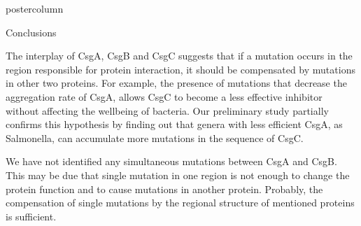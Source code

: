 \documentclass[final]{beamer}\usepackage[]{graphicx}\usepackage[]{color}
\begin{document}
\begin{frame}
\begin{columns}
\begin{column}{.51\textwidth}
\begin{beamercolorbox}[center,wd=\textwidth]{postercolumn}
\begin{minipage}[T]{.95\textwidth}
{    \begin{block}{Conclusions}
      
      
      The interplay of CsgA, CsgB and CsgC suggests that if a mutation occurs in the region responsible for protein interaction, it should be compensated by mutations in other two proteins. For example, the presence of mutations that decrease the aggregation rate of CsgA, allows CsgC to become a less effective inhibitor without affecting the wellbeing of bacteria. Our preliminary study partially confirms this hypothesis by finding out that genera with less efficient CsgA, as Salmonella, can accumulate more mutations in the sequence of CsgC.

We have not identified any simultaneous mutations between CsgA and CsgB. This may be due that single mutation in one region is not enough to change the protein function and to cause mutations in another protein. Probably, the compensation of single mutations by the regional structure of mentioned proteins is sufficient.

    \end{block}
    \vfill 
    

}
\end{minipage}
\end{beamercolorbox}
\end{column}
\end{columns}  
\end{frame}
\end{document}
